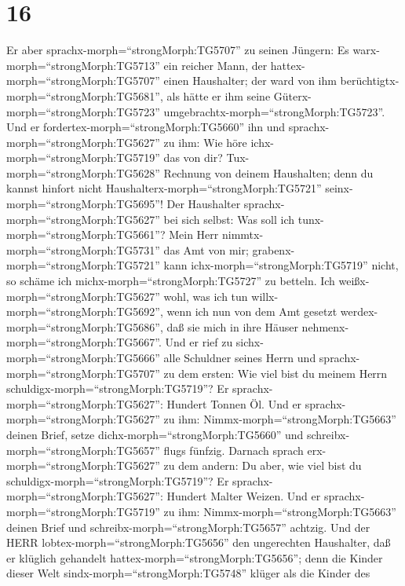 \hypertarget{section-15}{%
\section{16}\label{section-15}}

 Er aber sprachx-morph=``strongMorph:TG5707'' zu seinen
Jüngern: Es warx-morph=``strongMorph:TG5713'' ein reicher Mann, der
hattex-morph=``strongMorph:TG5707'' einen Haushalter; der ward von ihm
berüchtigtx-morph=``strongMorph:TG5681'', als hätte er ihm seine
Güterx-morph=``strongMorph:TG5723''
umgebrachtx-morph=``strongMorph:TG5723''.  Und er
fordertex-morph=``strongMorph:TG5660'' ihn und
sprachx-morph=``strongMorph:TG5627'' zu ihm: Wie höre
ichx-morph=``strongMorph:TG5719'' das von dir?
Tux-morph=``strongMorph:TG5628'' Rechnung von deinem Haushalten; denn du
kannst hinfort nicht Haushalterx-morph=``strongMorph:TG5721''
seinx-morph=``strongMorph:TG5695''!  Der Haushalter
sprachx-morph=``strongMorph:TG5627'' bei sich selbst: Was soll ich
tunx-morph=``strongMorph:TG5661''? Mein Herr
nimmtx-morph=``strongMorph:TG5731'' das Amt von mir;
grabenx-morph=``strongMorph:TG5721'' kann
ichx-morph=``strongMorph:TG5719'' nicht, so schäme ich
michx-morph=``strongMorph:TG5727'' zu betteln.  Ich
weißx-morph=``strongMorph:TG5627'' wohl, was ich tun
willx-morph=``strongMorph:TG5692'', wenn ich nun von dem Amt gesetzt
werdex-morph=``strongMorph:TG5686'', daß sie mich in ihre Häuser
nehmenx-morph=``strongMorph:TG5667''.  Und er rief zu
sichx-morph=``strongMorph:TG5666'' alle Schuldner seines Herrn und
sprachx-morph=``strongMorph:TG5707'' zu dem ersten: Wie viel bist du
meinem Herrn schuldigx-morph=``strongMorph:TG5719''?  Er
sprachx-morph=``strongMorph:TG5627'': Hundert Tonnen Öl. Und er
sprachx-morph=``strongMorph:TG5627'' zu ihm:
Nimmx-morph=``strongMorph:TG5663'' deinen Brief, setze
dichx-morph=``strongMorph:TG5660'' und
schreibx-morph=``strongMorph:TG5657'' flugs fünfzig. 
Darnach sprach erx-morph=``strongMorph:TG5627'' zu dem andern: Du aber,
wie viel bist du schuldigx-morph=``strongMorph:TG5719''? Er
sprachx-morph=``strongMorph:TG5627'': Hundert Malter Weizen. Und er
sprachx-morph=``strongMorph:TG5719'' zu ihm:
Nimmx-morph=``strongMorph:TG5663'' deinen Brief und
schreibx-morph=``strongMorph:TG5657'' achtzig.  Und der HERR
lobtex-morph=``strongMorph:TG5656'' den ungerechten Haushalter, daß er
klüglich gehandelt hattex-morph=``strongMorph:TG5656''; denn die Kinder
dieser Welt sindx-morph=``strongMorph:TG5748'' klüger als die Kinder des
